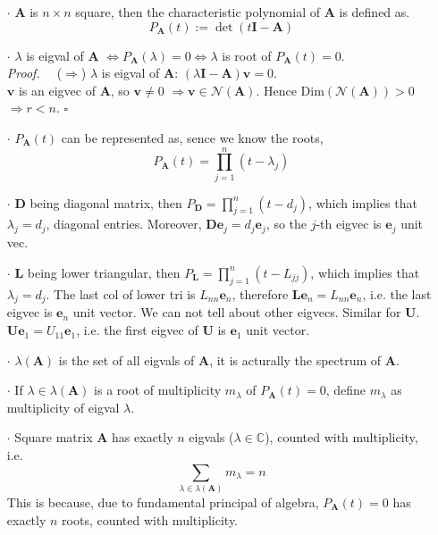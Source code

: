 \documentclass[a4paper, 11pt]{article}
\begin{document}
\begin{itemize}
  \item[$\cdot$] $\bm{A}$ is $n\times n$ square, then the characteristic polynomial of $\bm{A}$ is defined as.
  $$
  P_{\bm{A}}(t):=\det(t \bm{I} - \bm{A})
  $$
  \item[$\cdot$]$\lambda$ is eigval of $\bm{A}$ $\iff P_{\bm{A}}(\lambda) = 0\iff \lambda$ is root of $P_{\bm{A}}(t)=0$.\\
  \textit{Proof.~~} ($\Rightarrow$) $\lambda$ is eigval of $\bm{A}$: $(\lambda \bm{I}-\bm{A})\bm{v}=0$. \\
  $\bm{v}$ is an eigvec of $\bm{A}$, so $\bm{v}\ne 0$ $\Rightarrow \bm{v}\in \mathcal{N}(\bm{A})$.
  Hence $\text{Dim}(\mathcal{N}(\bm{A}))>0$ $\Rightarrow r<n$. $\square$

  \item[$\cdot$] $P_{\bm{A}}(t)$ can be represented as, sence we know the roots, 
  $$
  P_{\bm{A}}(t) = \prod_{j=1}^n (t- \lambda_j)
  $$
  \item[$\cdot$] $\bm{D}$ being diagonal matrix, then $P_{\bm{D}} = \prod_{j=1}^n (t- d_j)$, which implies that $\lambda_j = d_j$, diagonal entries. Moreover, $\bm{D}\bm{e}_j = d_j \bm{e}_j$, so the $j$-th eigvec is $\bm{e}_j$ unit vec.
  \item[$\cdot$] $\bm{L}$ being lower triangular, then $P_{\bm{L}} = \prod_{j=1}^n (t- L_{jj})$, which implies that $\lambda_j = d_j$. The last col of lower tri is $L_{nn} \bm{e}_n$, therefore $\bm{L}\bm{e}_n = L_{nn}\bm{e}_n$, i.e. the last eigvec is $\bm{e}_n$ unit vector. We can not tell about other eigvecs. Similar for $\bm{U}$. $\bm{U}\bm{e}_1 = U_{11}\bm{e}_1$, i.e. the first eigvec of $\bm{U}$ is $\bm{e}_1$ unit vector.
\end{itemize}

\begin{itemize}
  \item[$\cdot$] $\lambda(\bm{A})$ is the set of all eigvals of $\bm{A}$, it is acturally the spectrum of $\bm{A}$.
  \item[$\cdot$] If $\lambda \in \lambda(\bm{A})$ is a root of multiplicity $m_{\lambda}$ of $P_{\bm{A}}(t)=0$, define $m_{\lambda}$ as multiplicity of eigval $\lambda$.
  \item[$\cdot$] Square matrix $\bm{A}$ has exactly $n$ eigvals ($\lambda\in \mathbb{C}$), counted with multiplicity, i.e.
  $$
  \sum_{\lambda \in \lambda(\bm{A})} m_{\lambda} = n
  $$
  This is because, due to fundamental principal of algebra, $P_{\bm{A}}(t)=0$ has exactly $n$ roots, counted with multiplicity.
\end{itemize}
\end{document}
